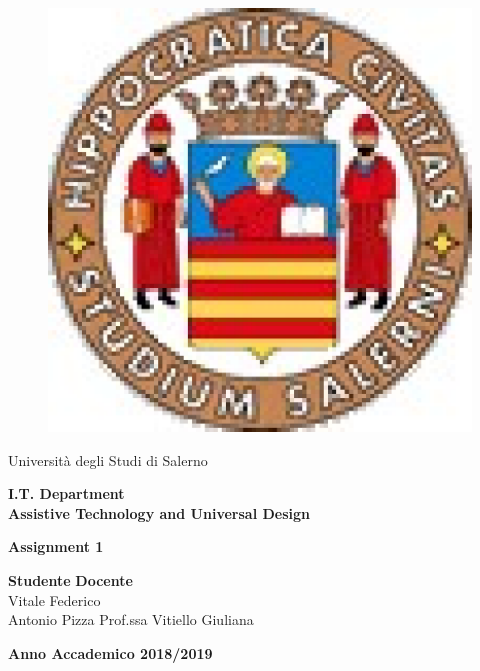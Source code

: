 \documentclass[11pt,oneside]{article}
\begin{document}
	
	\begin{titlepage}
		\begin{center}
			\hrulefill
			
			\begin{figure}[ht]\centering
				\includegraphics[width=3truecm]{Figure/logounisa.eps}
			\end{figure}
			
			
			{\Large Università degli Studi di Salerno}\\[0.2truecm]
			\hrulefill
			\vfill
		\end{center}
		
		
		
		
		\begin{center}
			
			\textbf{\Large I.T. Department}\\
			\vfill
			\textbf{\Large Assistive Technology and Universal Design}
		\end{center}
		\vfill  	
		\begin{center}
			\textbf{\Huge Assignment 1}\\[0.2truecm]
		\end{center}
		\vfill \vfill
		
		
		\vspace*{\fill}
		
		{\bf Studente } \hfill {\bf Docente}\ \ \\
		Vitale Federico \\ Antonio Pizza \hfill Prof.ssa Vitiello Giuliana\\
		
		\begin{center}
			\textbf{Anno Accademico 2018/2019}
		\end{center}
		
	\end{titlepage}
\end{document}

